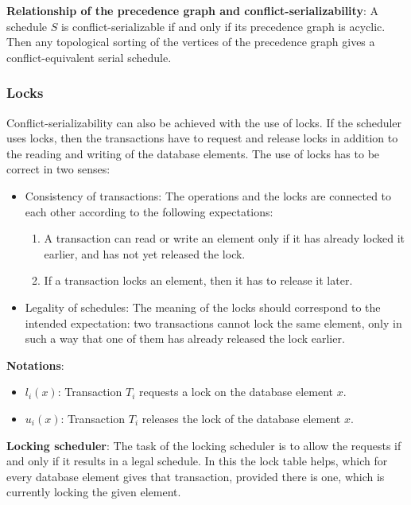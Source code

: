 \documentclass[margin=0px]{article}
\begin{document}
\noindent \textbf{Relationship of the precedence graph and conflict-serializability}: A schedule $S$ is conflict-serializable
if and only if its precedence graph is acyclic. Then any topological sorting of the vertices of the precedence graph gives
a conflict-equivalent serial schedule.

\subsubsection{Locks}

Conflict-serializability can also be achieved with the use of locks. If the scheduler uses locks, then the transactions have to
request and release locks in addition to the reading and writing of the database elements. The use of locks has to be correct in two
senses:

\begin{itemize}
    \item	Consistency of transactions: The operations and the locks are connected to each other according to the following expectations:
          \begin{enumerate}
              \item	A transaction can read or write an element only if it has already locked it earlier, and has not yet released
                    the lock.

              \item	If a transaction locks an element, then it has to release it later.
          \end{enumerate}

    \item	Legality of schedules: The meaning of the locks should correspond to the intended expectation: two transactions cannot lock
          the same element, only in such a way that one of them has already released the lock earlier.
\end{itemize}

\noindent \textbf{Notations}:
\begin{itemize}
    \item	$l_{i}(x)$: Transaction $T_{i}$ requests a lock on the database element $x$.
    \item	$u_{i}(x)$: Transaction $T_{i}$ releases the lock of the database element $x$.
\end{itemize}

\noindent \textbf{Locking scheduler}: The task of the locking scheduler is to allow the requests if and only if
it results in a legal schedule. In this the lock table helps, which for every database element gives that transaction, provided
there is one, which is currently locking the given element.\\
\end{document}
